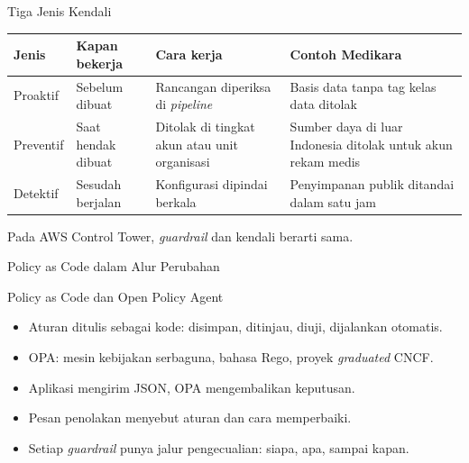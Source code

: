 \documentclass[aspectratio=169, table, 12pt]{beamer}
\begin{document}
\begin{frame}{{\Large Tiga Jenis Kendali}}
  \footnotesize
  \begin{tabularx}{\textwidth}{>{\raggedright\arraybackslash}p{1.7cm}
      >{\raggedright\arraybackslash}p{2.6cm} >{\raggedright\arraybackslash}X
      >{\raggedright\arraybackslash}X}
    \hline
    \textbf{Jenis} & \textbf{Kapan bekerja} & \textbf{Cara kerja} & \textbf{Contoh Medikara} \\
      \hline
    Proaktif & Sebelum dibuat & Rancangan diperiksa di \textit{pipeline} & Basis data tanpa tag
      kelas data ditolak \\ \hline
    Preventif & Saat hendak dibuat & Ditolak di tingkat akun atau unit organisasi & Sumber daya di
      luar Indonesia ditolak untuk akun rekam medis \\ \hline
    Detektif & Sesudah berjalan & Konfigurasi dipindai berkala & Penyimpanan publik ditandai dalam
      satu jam \\ \hline
  \end{tabularx}

  \vspace{8pt}
  \small Pada AWS Control Tower, \textit{guardrail} dan kendali berarti sama.
\end{frame}

\begin{frame}{{\Large Policy as Code dalam Alur Perubahan}}
  \centering
\end{frame}

\begin{frame}{{\Large Policy as Code dan Open Policy Agent}}
  \vspace{10pt}
  \begin{itemize}
    \item Aturan ditulis sebagai kode: disimpan, ditinjau, diuji, dijalankan otomatis.
    \item OPA: mesin kebijakan serbaguna, bahasa Rego, proyek \textit{graduated} CNCF.
    \item Aplikasi mengirim JSON, OPA mengembalikan keputusan.
    \item Pesan penolakan menyebut aturan dan cara memperbaiki.
    \item Setiap \textit{guardrail} punya jalur pengecualian: siapa, apa, sampai kapan.
  \end{itemize}
\end{frame}
\end{document}
